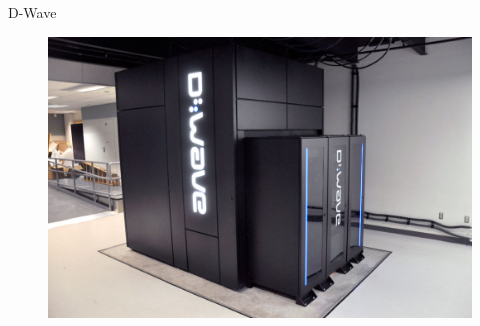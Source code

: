 \documentclass{beamer}
\begin{document}
\begin{frame}{D-Wave}
\begin{figure}
  \includegraphics[scale=.25]{pasted14}
\end{figure}
\end{frame}
\end{document}
